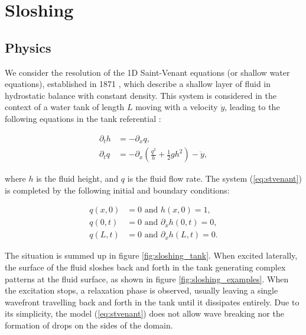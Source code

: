 \chapter{Sloshing}

\section{Physics}

We consider the resolution of the 1D Saint-Venant equations (or shallow water equations), established in 1871 \cite{saintvenant1871}, which describe a shallow layer of fluid in hydrostatic balance with constant density. This system is considered in the context of a water tank of length $L$ moving with a velocity $\dot{y}$, leading to the following equations in the tank referential \cite{berger2022}:

\begin{equation}
\label{eq:stvenant}
\begin{split}
	\partial_t h 	&= -\partial_x q, \\
	\partial_t q		&= -\partial_x \left( \frac{q^2}{h} + \frac{1}{2} g h^2 \right) - \ddot{y},
\end{split}
\end{equation}

where $h$ is the fluid height, and $q$ is the fluid flow rate. The system (\ref{eq:stvenant}) is completed by the following initial and boundary conditions:

\begin{equation}
\label{eq:stvenant_bc}
\begin{split}
	q(x,0)	&= 0 \text{ and } h(x,0)	= 1, \\
	q(0,t) 	&= 0 \text{ and } \partial_x h(0,t) = 0, \\
	q(L,t) 	&= 0 \text{ and } \partial_x h(L,t) = 0.
\end{split}
\end{equation}

The situation is summed up in figure \ref{fig:sloshing_tank}. When excited laterally, the surface of the fluid sloshes back and forth in the tank generating complex patterns at the fluid surface, as shown in figure \ref{fig:sloshing_examples}. When the excitation stops, a relaxation phase is observed, usually leaving a single wavefront travelling back and forth in the tank until it dissipates entirely. Due to its simplicity, the model (\ref{eq:stvenant}) does not allow wave breaking nor the formation of drops on the sides of the domain.

